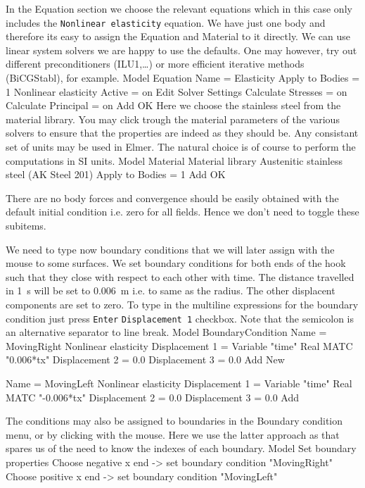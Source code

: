 In the Equation section we choose the relevant equations which in this case only includes 
the \texttt{Nonlinear elasticity} equation.
We have just one body and therefore its easy to assign 
the Equation and Material to it directly.
We can use linear system solvers we are happy to use the defaults. One may however, try out different
preconditioners (ILU1,\ldots) or more efficient iterative methods (BiCGStabl), for example.
\ttbegin
Model
  Equation
    Name = Elasticity
    Apply to Bodies = 1
    Nonlinear elasticity
      Active = on
      Edit Solver Settings
        Calculate Stresses = on
        Calculate Principal = on
    Add 
    OK
\ttend        
Here we choose the stainless steel from the material library.
You may click trough the material parameters of the various solvers to ensure that
the properties are indeed as they should be. Any consistant set of units may be used in Elmer.
The natural choice is of course to perform the computations in SI units. 
\ttbegin
Model
  Material
    Material library    
      Austenitic stainless steel (AK Steel 201)
    Apply to Bodies = 1 
    Add
    OK
\ttend

There are no body forces and convergence should be easily obtained with the default 
initial condition i.e. zero for all fields. Hence we don't need to toggle these subitems. 

We need to type now boundary conditions that we will later assign with the mouse to some surfaces.
We set boundary conditions for both ends of the hook such that
they close with respect to each other with time. The distance travelled in 1~s will be set to
0.006~m i.e. to same as the radius. The other displacent components are set to zero.  
To type in the multiline expressions for the boundary condition just press \texttt{Enter}
\texttt{Displacement 1} checkbox.
Note that the semicolon is an alternative separator
to line break. 
\ttbegin
Model
  BoundaryCondition
    Name = MovingRight
    Nonlinear elasticity
      Displacement 1 = Variable "time"
        Real MATC "0.006*tx"
      Displacement 2 = 0.0
      Displacement 3 = 0.0
    Add
    New

    Name = MovingLeft 
    Nonlinear elasticity
      Displacement 1 = Variable "time"
        Real MATC "-0.006*tx"
      Displacement 2 = 0.0
      Displacement 3 = 0.0
    Add 
\ttend   

The conditions may also be assigned to boundaries in the Boundary condition menu, or 
by clicking with the mouse. Here we use the latter approach as that spares us of the 
need to know the indexes of each boundary.
\ttbegin
Model
  Set boundary properties
    Choose negative x end -> set boundary condition "MovingRight"
    Choose positive x end  -> set boundary condition "MovingLeft"
\ttend

